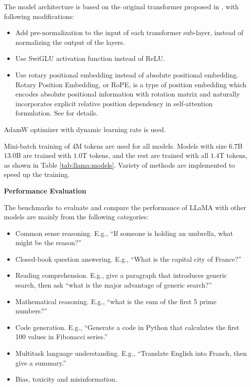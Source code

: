 The model architecture is based on the original transformer proposed in \cite{vaswani2017attention}, with following modifications:
\begin{itemize}
	\item Add pre-normalization to the input of each transformer sub-layer, instead of normalizing the output of the layers.
	\item Use SwiGLU activation function instead of ReLU.
	\item Use rotary positional embedding instead of absolute positional embedding. Rotary Position Embedding, or RoPE, is a type of position embedding which encodes absolute positional information with rotation matrix and naturally incorporates explicit relative position dependency in self-attention formulation. See \cite{su2022roformer} for details.
\end{itemize}

AdamW optimizer with dynamic learning rate is used.

Mini-batch training of $4$M tokens are used for all models. Models with size $6.7$B $13.0$B are trained with $1.0$T tokens, and the rest are trained with all $1.4$T tokens, as shown in Table \ref{tab:llama:models}. Variety of methods are implemented to speed up the training.

\vspace{0.1in}
\noindent \textbf{Performance Evaluation}
\vspace{0.1in}

The benchmarks to evaluate and compare the performance of LLaMA with other models are mainly from the following categories:
\begin{itemize}
	\item Common sense reasoning. E.g., ``If someone is holding an umbrella, what might be the reason?''
	\item Closed-book question answering. E.g., ``What is the capital city of France?''
	\item Reading comprehension. E.g., give a paragraph that introduces generic search, then ask ``what is the major advantage of generic search?''
	\item Mathematical reasoning. E.g., ``what is the sum of the first 5 prime numbers?''
	\item Code generation. E.g., ``Generate a code in Python that calculates the first 100 values in Fibonacci series.''
	\item Multitask language understanding. E.g., ``Translate English into Franch, then give a summary.''
	\item Bias, toxicity and misinformation.
\end{itemize}

